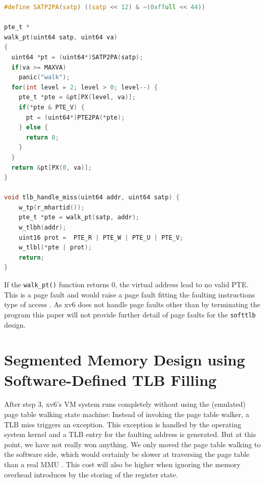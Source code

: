 \begin{lstlisting}[language=c,float=t,basicstyle=\footnotesize,
    caption={\textbf{TLB miss exception Handler with Page Table Walk}
    The \texttt{walk\_pt()} function walks the Sv39 page table with the base address
    encoded in the \texttt{satp} register. If a PTE with the valid bit set is found, the function
    returns the address encoded in the PTE.
    Otherwise, the function returns \texttt{0}.},
    label={lst:softptw}]
#define SATP2PA(satp) ((satp << 12) & ~(0xffull << 44))

pte_t *
walk_pt(uint64 satp, uint64 va)
{
  uint64 *pt = (uint64*)SATP2PA(satp);
  if(va >= MAXVA)
    panic("walk");
  for(int level = 2; level > 0; level--) {
    pte_t *pte = &pt[PX(level, va)];
    if(*pte & PTE_V) {
      pt = (uint64*)PTE2PA(*pte);
    } else {
      return 0;
    }
  }
  return &pt[PX(0, va)];
}

void tlb_handle_miss(uint64 addr, uint64 satp) {
    w_tp(r_mhartid());
    pte_t *pte = walk_pt(satp, addr);
    w_tlbh(addr);
    uint16 prot =  PTE_R | PTE_W | PTE_U | PTE_V;
    w_tlbl(*pte | prot);
    return;
}
\end{lstlisting}



If the \texttt{walk\_pt()} function returns 0, the virtual address lead to no valid PTE. This is a
page fault and would raise a page fault fitting the faulting instructions type of access \cite{tanenbaumOS}.
As xv6 does not handle page faults other than by terminating the program \cite{cox2011xv6} this
paper will not provide further detail of page faults for the \texttt{softtlb}
design.



\section{Segmented Memory Design using Software-Defined TLB Filling}

After step 3, xv6's VM system runs completely without using the (emulated) page table
walking state machine:
Instead of invoking the page table walker, a TLB miss triggers an exception. This exception is handled by the
operating system kernel and a TLB entry for the faulting address is generated.
But at this point, we have not really won anything. We only moved the page table walking to the software side,
which would certainly be slower at traversing the page table than a real MMU \cite{jacob1998look}. This cost will also be higher when ignoring the memory overhead introduces by the storing of the register state.

